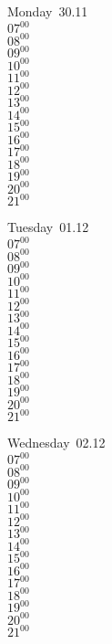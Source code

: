 \documentclass[11pt,a4paper]{book}\usepackage[]{graphicx}\usepackage[]{color}
\begin{document}
\begin{headerbox}
\end{headerbox}
\begin{weekdaybox}
  Monday~30.11\\
  { 
  \vfill
  $07^{00}$\\
$08^{00}$\\
$09^{00}$\\
$10^{00}$\\
$11^{00}$\\
$12^{00}$\\
$13^{00}$\\
$14^{00}$\\
$15^{00}$\\
$16^{00}$\\
$17^{00}$\\
$18^{00}$\\
$19^{00}$\\
$20^{00}$\\
$21^{00}$\\
  }
\end{weekdaybox}
\begin{weekdaybox}
  Tuesday~01.12\\
  { 
  \vfill
  $07^{00}$\\
$08^{00}$\\
$09^{00}$\\
$10^{00}$\\
$11^{00}$\\
$12^{00}$\\
$13^{00}$\\
$14^{00}$\\
$15^{00}$\\
$16^{00}$\\
$17^{00}$\\
$18^{00}$\\
$19^{00}$\\
$20^{00}$\\
$21^{00}$\\
  }
\end{weekdaybox}
\begin{weekdaybox}
  Wednesday~02.12\\
  { 
  \vfill
  $07^{00}$\\
$08^{00}$\\
$09^{00}$\\
$10^{00}$\\
$11^{00}$\\
$12^{00}$\\
$13^{00}$\\
$14^{00}$\\
$15^{00}$\\
$16^{00}$\\
$17^{00}$\\
$18^{00}$\\
$19^{00}$\\
$20^{00}$\\
$21^{00}$\\
  }
\end{weekdaybox}
\end{document}
